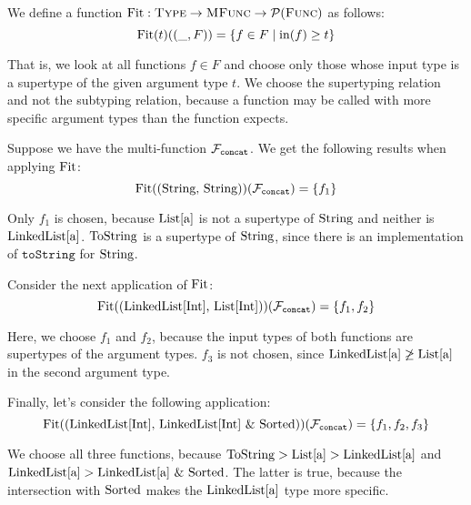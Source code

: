 \medskip

\noindent We define a function $\operatorname{Fit} : \textsc{Type} \rightarrow \textsc{MFunc} \rightarrow \mathcal{P}(\textsc{Func})$ as follows:
\begin{equation*}
	\operatorname{Fit}(t)((\_, F)) = \{ f \in F \mid \operatorname{in}(f) \geq t \}
\end{equation*}

\noindent That is, we look at all functions $f \in F$ and choose only those whose input type is a supertype of the given argument type $t$. We choose the supertyping relation and not the subtyping relation, because a function may be called with more specific argument types than the function expects.

\begin{example}
	Suppose we have the multi-function $\mathcal{F}_{\text{\texttt{concat}}}$. We get the following results when applying $\operatorname{Fit}$:
	\begin{equation*}
		\operatorname{Fit}(\text{(String, String)})(\mathcal{F}_{\text{\texttt{concat}}}) = \{ f_1 \}
	\end{equation*}	
	
	\noindent Only $f_1$ is chosen, because $\text{List[a]}$ is not a supertype of $\text{String}$ and neither is $\text{LinkedList[a]}$. $\text{ToString}$ is a supertype of $\text{String}$, since there is an implementation of $\mathtt{toString}$ for $\text{String}$. 
	
	\medskip
	
	\noindent Consider the next application of $\operatorname{Fit}$:
	\begin{equation*}
		\operatorname{Fit}(\text{(LinkedList[Int], List[Int])})(\mathcal{F}_{\text{\texttt{concat}}}) = \{ f_1, f_2 \}
	\end{equation*}
	
	\noindent Here, we choose $f_1$ and $f_2$, because the input types of both functions are supertypes of the argument types. $f_3$ is not chosen, since $\text{LinkedList[a]} \not\geq \text{List[a]}$ in the second argument type.
	
	\medskip
	
	\noindent Finally, let's consider the following application:
	\begin{equation*}
		\operatorname{Fit}(\text{(LinkedList[Int], LinkedList[Int] \& Sorted)})(\mathcal{F}_{\text{\texttt{concat}}}) = \{ f_1, f_2, f_3 \}
	\end{equation*}
	
	\noindent We choose all three functions, because $\text{ToString} > \text{List[a]} > \text{LinkedList[a]}$ and $ \text{LinkedList[a]} > \text{LinkedList[a] \& Sorted}$. The latter is true, because the intersection with $\text{Sorted}$ makes the $\text{LinkedList[a]}$ type more specific.
\end{example}


